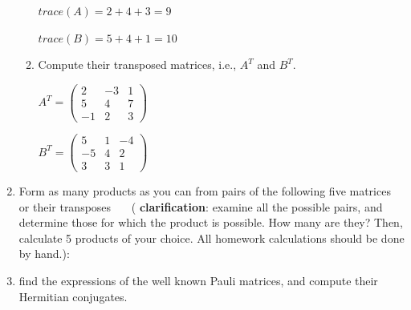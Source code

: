 \documentclass[fleqn]{article}
\begin{document}
\begin{enumerate}
\begin{enumerate}
  $
  trace(A)=2+4+3=9
  $
  
  $
  trace(B)=5+4+1=10
  $
  
  \item  Compute their transposed matrices, i.e., $A^T$ and $B^T$. 
  
  \noindent
  $A^T=
  \begin{pmatrix}
    2 & -3 & 1 \\
    5 & 4 & 7 \\
    -1 & 2 & 3
  \end{pmatrix}
  $
  
  \noindent
  $B^T=
  \begin{pmatrix}
    5 & 1 & -4 \\
    -5 & 4 & 2 \\
    3 & 3 & 1
  \end{pmatrix}
  $
  
  \end{enumerate}
  
  \item Form as many products as you can from pairs of the following five matrices or their transposes ~~~( {\bf clarification}: examine all the possible pairs, and determine those for which the product is possible. How many are they?  Then, calculate 5 products of your choice. All homework calculations should be done by hand.): 
  
  
  \item find the expressions of the well known Pauli matrices, and compute their Hermitian conjugates. 
  
  \end{enumerate}
\end{document}
